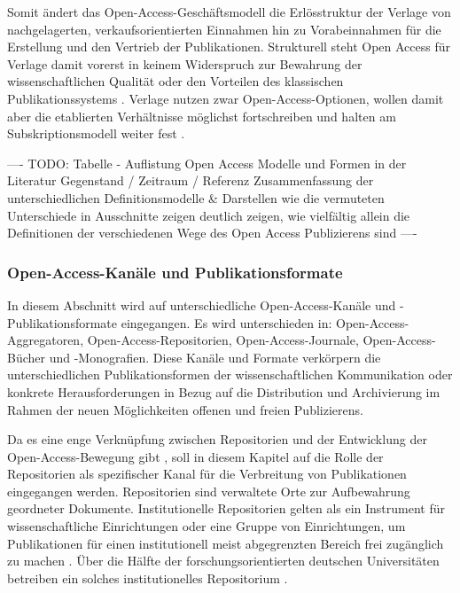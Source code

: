 Somit ändert das Open-Access-Geschäftsmodell die Erlösstruktur der Verlage von nachgelagerten, verkaufsorientierten Einnahmen hin zu Vorabeinnahmen für die Erstellung und den Vertrieb der Publikationen. Strukturell steht Open Access für Verlage damit vorerst in keinem Widerspruch zur Bewahrung der wissenschaftlichen Qualität oder den Vorteilen des klassischen Publikationssystems \cite{Suber_2002}. Verlage nutzen zwar Open-Access-Optionen, wollen damit aber die etablierten Verhältnisse möglichst fortschreiben und halten am Subskriptionsmodell weiter fest \cite{schmidt_2007_goldenen}.

---- TODO: Tabelle - Auflistung Open Access  Modelle und Formen in der Literatur
Gegenstand / Zeitraum / Referenz Zusammenfassung der unterschiedlichen Definitionsmodelle & Darstellen wie die vermuteten Unterschiede in Ausschnitte zeigen deutlich zeigen, wie vielfältig allein die Definitionen der verschiedenen Wege des Open Access Publizierens sind ----

\subsubsection{Open-Access-Kanäle und Publikationsformate}

In diesem Abschnitt wird auf unterschiedliche Open-Access-Kanäle und -Publikationsformate eingegangen. Es wird unterschieden in: Open-Access-Aggregatoren, Open-Access-Repositorien, Open-Access-Journale, Open-Access-Bücher und -Monografien. Diese Kanäle und Formate verkörpern die unterschiedlichen Publikationsformen der wissenschaftlichen Kommunikation oder konkrete Herausforderungen in Bezug auf die Distribution und Archivierung im Rahmen der neuen Möglichkeiten offenen und freien Publizierens.

Da es eine enge Verknüpfung zwischen Repositorien und der Entwicklung der Open-Access-Bewegung gibt \cite{adema_2013_political} \cite{offhaus_2012_institutionelle_repos}, soll in diesem Kapitel auf die Rolle der Repositorien als spezifischer Kanal für die Verbreitung von Publikationen eingegangen werden. Repositorien sind verwaltete Orte zur Aufbewahrung geordneter Dokumente. Institutionelle Repositorien gelten als ein Instrument für wissenschaftliche Einrichtungen oder eine Gruppe von Einrichtungen, um Publikationen für einen institutionell meist abgegrenzten Bereich frei zugänglich zu machen \cite{dobratz_2007_open} \cite{Baggs_2006}. Über die Hälfte der forschungsorientierten deutschen Universitäten betreiben ein solches institutionelles Repositorium \cite{Schmidt_2009}.

